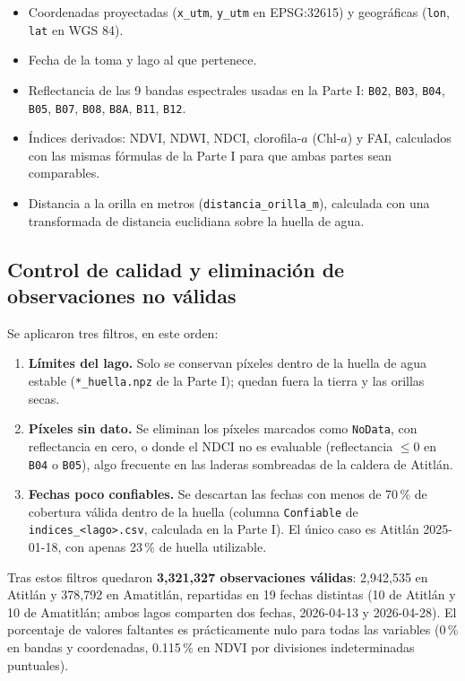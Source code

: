 \documentclass[11pt]{article}
\begin{document}
\begin{itemize}
    \item Coordenadas proyectadas (\texttt{x\_utm}, \texttt{y\_utm} en EPSG:32615) y geográficas (\texttt{lon}, \texttt{lat} en WGS 84).
    \item Fecha de la toma y lago al que pertenece.
    \item Reflectancia de las 9 bandas espectrales usadas en la Parte I: \texttt{B02}, \texttt{B03}, \texttt{B04}, \texttt{B05}, \texttt{B07}, \texttt{B08}, \texttt{B8A}, \texttt{B11}, \texttt{B12}.
    \item Índices derivados: NDVI, NDWI, NDCI, clorofila-\(a\) (Chl-\(a\)) y FAI, calculados con las mismas fórmulas de la Parte I para que ambas partes sean comparables.
    \item Distancia a la orilla en metros (\texttt{distancia\_orilla\_m}), calculada con una transformada de distancia euclidiana sobre la huella de agua.
\end{itemize}

\subsection{Control de calidad y eliminación de observaciones no válidas}

Se aplicaron tres filtros, en este orden:

\begin{enumerate}
    \item \textbf{Límites del lago.} Solo se conservan píxeles dentro de la huella de agua estable (\texttt{*\_huella.npz} de la Parte I); quedan fuera la tierra y las orillas secas.
    \item \textbf{Píxeles sin dato.} Se eliminan los píxeles marcados como \texttt{NoData}, con reflectancia en cero, o donde el NDCI no es evaluable (reflectancia \(\le 0\) en \texttt{B04} o \texttt{B05}), algo frecuente en las laderas sombreadas de la caldera de Atitlán.
    \item \textbf{Fechas poco confiables.} Se descartan las fechas con menos de 70\,\% de cobertura válida dentro de la huella (columna \texttt{Confiable} de \texttt{indices\_<lago>.csv}, calculada en la Parte I). El único caso es Atitlán 2025-01-18, con apenas 23\,\% de huella utilizable.
\end{enumerate}

Tras estos filtros quedaron \textbf{3{,}321{,}327 observaciones válidas}: 2{,}942{,}535 en Atitlán y 378{,}792 en Amatitlán, repartidas en 19 fechas distintas (10 de Atitlán y 10 de Amatitlán; ambos lagos comparten dos fechas, 2026-04-13 y 2026-04-28). El porcentaje de valores faltantes es prácticamente nulo para todas las variables (0\,\% en bandas y coordenadas, 0.115\,\% en NDVI por divisiones indeterminadas puntuales).
\end{document}
